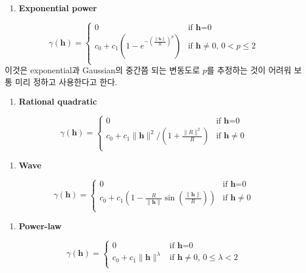 \documentclass[b5paper,]{book}
\providecommand{\tightlist}{%
  \setlength{\itemsep}{0pt}\setlength{\parskip}{0pt}}
\theoremstyle{definition}
\theoremstyle{definition}
\theoremstyle{definition}
\theoremstyle{remark}
\begin{document}
\begin{enumerate}
\def\labelenumi{\arabic{enumi}.}
\setcounter{enumi}{4}
\tightlist
\item
  \textbf{Exponential power}
\end{enumerate}

\[
\gamma(\mathbf{h})= \left\{ \begin{array}{ll}
0 & \textrm{if $\mathbf{h}$=0}\\
c_{0}+c_{1}(1-e^{-(\frac{\|\mathbf{h}\|}{R})^{p}}) & \textrm{if $\mathbf{h}\neq 0$, $0 < p \leq 2$}\\
\end{array} \right.
\] 이것은 exponential과 Gaussian의 중간쯤 되는 변동도로 \(p\)를 추정하는
것이 어려워 보통 미리 정하고 사용한다고 한다.

\begin{enumerate}
\def\labelenumi{\arabic{enumi}.}
\setcounter{enumi}{5}
\tightlist
\item
  \textbf{Rational quadratic}
\end{enumerate}

\[
\gamma(\mathbf{h})= \left\{ \begin{array}{ll}
0 & \textrm{if $\mathbf{h}$=0}\\
c_{0}+c_{1}\| \mathbf{h}\|^{2}/(1+\frac{\|R\|^{2}}{R}) & \textrm{if $\mathbf{h}\neq 0$}\\
\end{array} \right.
\]

\begin{enumerate}
\def\labelenumi{\arabic{enumi}.}
\setcounter{enumi}{6}
\tightlist
\item
  \textbf{Wave}
\end{enumerate}

\[
\gamma(\mathbf{h})= \left\{ \begin{array}{ll}
0 & \textrm{if $\mathbf{h}$=0}\\
c_{0}+c_{1}(1-\frac{R}{\|\mathbf{h}\|}\sin(\frac{\|\mathbf{h}\|}{R})) & \textrm{if $\mathbf{h}\neq 0$}\\
\end{array} \right.
\]

\begin{enumerate}
\def\labelenumi{\arabic{enumi}.}
\setcounter{enumi}{7}
\tightlist
\item
  \textbf{Power-law}
\end{enumerate}

\[
\gamma(\mathbf{h})= \left\{ \begin{array}{ll}
0 & \textrm{if $\mathbf{h}$=0}\\
c_{0}+c_{1}\| \mathbf{h}\|^{\lambda} & \textrm{if $\mathbf{h}\neq 0$, $0\leq \lambda < 2$}\\
\end{array} \right.
\]
\end{document}
